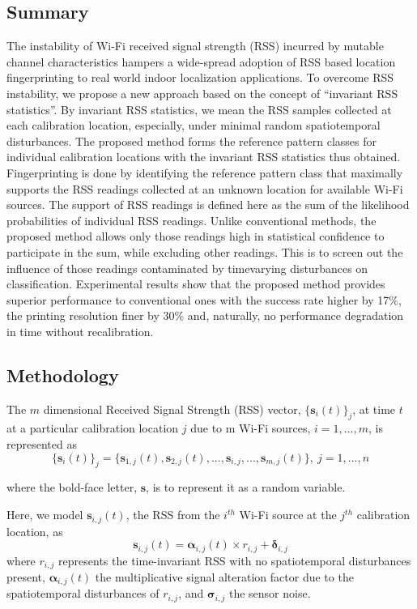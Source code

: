 \documentclass{ieeeaccess}
\begin{document}
\subsection{Summary}
The instability of Wi-Fi received signal strength (RSS) incurred
by mutable channel characteristics hampers a wide-spread
adoption of RSS based location fingerprinting to real world indoor
localization applications. To overcome RSS instability, we
propose a new approach based on the concept of “invariant RSS
statistics”. By invariant RSS statistics, we mean the RSS samples
collected at each calibration location, especially, under minimal
random spatiotemporal disturbances. The proposed method\cite{Husen:2016:HPI:2857546.2857589} forms
the reference pattern classes for individual calibration locations
with the invariant RSS statistics thus obtained. Fingerprinting is
done by identifying the reference pattern class that maximally
supports the RSS readings collected at an unknown location for
available Wi-Fi sources. The support of RSS readings is defined
here as the sum of the likelihood probabilities of individual RSS
readings. Unlike conventional methods, the proposed method
allows only those readings high in statistical confidence to
participate in the sum, while excluding other readings. This is to
screen out the influence of those readings contaminated by timevarying disturbances on classification. Experimental results show
that the proposed method provides superior performance to
conventional ones with the success rate higher by 17\%, the
printing resolution finer by 30\% and, naturally, no performance
degradation in time without recalibration.

\subsection{Methodology}
The $m$ dimensional Received Signal Strength (RSS) vector,
$\{\mathbf{s}_i(t)\}_j$, at time $t$ at a particular calibration location $j$ due to m Wi-Fi sources, $i=1, …, m$, is represented as
\begin{equation}
\{\mathbf{s}_i(t)\}_j=\{\mathbf{s}_{1,j}(t), \mathbf{s}_{2,j}(t),...,\mathbf{s}_{i,j},...,\mathbf{s}_{m,j}(t)\},\ j=1,...,n
\end{equation}

where the bold-face letter, $\mathbf{s}$, is to represent it as a random
variable.

Here, we model $\mathbf{s}_{i,j}(t)$, the RSS from the $i^{th}$ Wi-Fi source at the $j^{th}$
calibration location, as
\begin{equation}
\mathbf{s}_{i,j}(t)=\bm{\alpha}_{i,j}(t)\times r_{i,j}+\bm{\delta}_{i,j}
\end{equation}
where $r_{i,j}$ represents the time-invariant RSS with no
spatiotemporal disturbances present, $\bm{\alpha}_{i,j}(t)$ the multiplicative
signal alteration factor due to the spatiotemporal disturbances of
$r_{i,j}$, and $\bm{\sigma}_{i,j}$ the sensor noise. 
\end{document}

